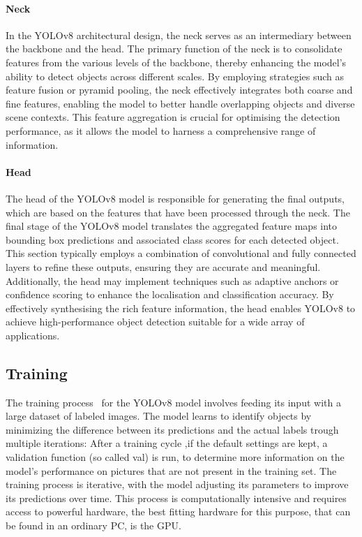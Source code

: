 \paragraph{Neck}\label{par:neck}
In the YOLOv8 architectural design, the neck serves as an intermediary between the backbone and the head.
The primary function of the neck is to consolidate features from the various levels of the backbone,
thereby enhancing the model's ability to detect objects across different scales.
By employing strategies such as feature fusion or pyramid pooling,
the neck effectively integrates both coarse and fine features,
enabling the model to better handle overlapping objects and diverse scene contexts.
This feature aggregation is crucial for optimising the detection performance,
as it allows the model to harness a comprehensive range of information.



\paragraph{Head}\label{par:head}
The head of the YOLOv8 model is responsible for generating the final outputs,
which are based on the features that have been processed through the neck.
The final stage of the YOLOv8 model translates the aggregated feature maps into bounding box predictions and associated class scores for each detected object.
This section typically employs a combination of convolutional and fully connected layers to refine these outputs,
ensuring they are accurate and meaningful.
Additionally, the head may implement techniques such as adaptive anchors or
confidence scoring to enhance the localisation and classification accuracy.
By effectively synthesising the rich feature information, the head enables YOLOv8 to achieve high-performance object detection suitable for a wide array of applications.

\subsection{Training}\label{subsec:training}
The training process~\cite{redmon2016lookonceunifiedrealtime} for the YOLOv8 model involves feeding its input with a large dataset of labeled images.
The model learns to identify objects by minimizing the difference between its predictions and the actual labels trough multiple iterations:
After a training cycle ,if the default settings are kept, a validation function (so called val) is run,
to determine more information on the model's performance on pictures that are not present in the training set.
The training process is iterative, with the model adjusting its parameters to improve its predictions over time.
This process is computationally intensive and requires access to powerful hardware,
the best fitting hardware for this purpose, that can be found in an ordinary PC, is the GPU\@.

